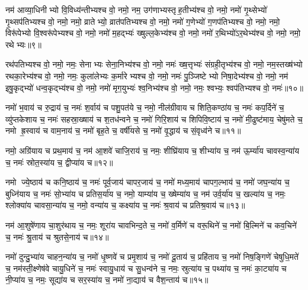 {\anuvakamend[{कु॒लु॒ञ्चाना॒म्पत॑ये॒ नमो॒ नमोऽश्व॑पतिभ्य॒स्त्रीणि॑ च॥३॥}]}

नम॑ आव्या॒धिनीभ्यो वि॒विध्य॑न्तीभ्यश्च वो॒ नमो॒ नम॒ उग॑णाभ्यस्तृह॒तीभ्य॑श्च वो॒ नमो॒ नमो॑ गृ॒थ्सेभ्यो॑ गृ॒थ्सप॑तिभ्यश्च वो॒ नमो॒ नमो॒ व्रातेभ्यो॒ व्रात॑पतिभ्यश्च वो॒ नमो॒ नमो॑ ग॒णेभ्यो॑ ग॒णप॑तिभ्यश्च वो॒ नमो॒ नमो॒ विरू॑पेभ्यो वि॒श्वरू॑पेभ्यश्च वो॒ नमो॒ नमो॑ म॒हद्भ्यः॑ ख्षुल्ल॒केभ्य॑श्च वो॒ नमो॒ नमो॑ र॒थिभ्यो॑ऽर॒थेभ्य॑श्च वो॒ नमो॒ नमो॒ रथेभ्यः॥९॥

रथ॑पतिभ्यश्च वो॒ नमो॒ नमः॒ सेनाभ्यः सेना॒निभ्य॑श्च वो॒ नमो॒ नमः॑ ख्ष॒त्तृभ्यः॑ संग्रही॒तृभ्य॑श्च वो॒ नमो॒ नम॒स्तख्ष॑भ्यो रथका॒रेभ्य॑श्च वो॒ नमो॒ नमः॒ कुला॑लेभ्यः क॒र्मारेभ्यश्च वो॒ नमो॒ नमः॑ पु॒ञ्जिष्टेभ्यो निषा॒देभ्य॑श्च वो॒ नमो॒ नम॑ इषु॒कृद्भ्यो॑ धन्व॒कृद्भ्य॑श्च वो॒ नमो॒ नमो॑ मृग॒युभ्यः॑ श्व॒निभ्य॑श्च वो॒ नमो॒ नमः॒ श्वभ्यः॒ श्वप॑तिभ्यश्च वो॒ नमः॑॥१०॥

{\anuvakamend[{रथेभ्यः॒ श्वप॑तिभ्यश्च॒ द्वे च॑॥४॥}]}

नमो॑ भ॒वाय॑ च रु॒द्राय॑ च॒ नमः॑ श॒र्वाय॑ च पशु॒पत॑ये च॒ नमो॒ नील॑ग्रीवाय च शिति॒कण्ठा॑य च॒ नमः॑ कप॒र्दिने॑ च॒ व्यु॑प्तकेशाय च॒ नमः॑ सहस्रा॒ख्षाय॑ च श॒तध॑न्वने च॒ नमो॑ गिरि॒शाय॑ च शिपिवि॒ष्टाय॑ च॒ नमो॑ मी॒ढुष्ट॑माय॒ चेषु॑मते च॒ नमो ह्र॒स्वाय॑ च वाम॒नाय॑ च॒ नमो॑ बृह॒ते च॒ वर्\mbox{}षी॑यसे च॒ नमो॑ वृ॒द्धाय॑ च सं॒वृध्व॑ने च॥११॥

नमो॒ अग्रि॑याय च प्रथ॒माय॑ च॒ नम॑ आ॒शवे॑ चाजि॒राय॑ च॒ नमः॒ शीघ्रि॑याय च॒ शीभ्या॑य च॒ नम॑ ऊ॒र्म्या॑य चावस्व॒न्या॑य च॒ नमः॑ स्रोत॒स्या॑य च॒ द्वीप्या॑य च॥१२॥

{\anuvakamend[{सं॒ वृध्व॑ने च॒ पञ्च॑विशतिश्च॥५॥}]}

नमो ज्ये॒ष्ठाय॑ च कनि॒ष्ठाय॑ च॒ नमः॑ पूर्व॒जाय॑ चापर॒जाय॑ च॒ नमो॑ मध्य॒माय॑ चापग॒ल्भाय॑ च॒ नमो॑ जघ॒न्या॑य च॒ बुध्नि॑याय च॒ नमः॑ सो॒भ्या॑य च प्रतिस॒र्या॑य च॒ नमो॒ याम्या॑य च॒ ख्षेम्या॑य च॒ नम॑ उर्व॒र्या॑य च॒ खल्या॑य च॒ नमः॒ श्लोक्या॑य चावसा॒न्या॑य च॒ नमो॒ वन्या॑य च॒ कक्ष्या॑य च॒ नमः॑ श्र॒वाय॑ च प्रतिश्र॒वाय॑ च॥१३॥

नम॑ आ॒शुषे॑णाय चा॒शुर॑थाय च॒ नमः॒ शूरा॑य चावभिन्द॒ते च॒ नमो॑ व॒र्मिणे॑ च वरू॒थिने॑ च॒ नमो॑ बि॒ल्मिने॑ च कव॒चिने॑ च॒ नमः॑ श्रु॒ताय॑ च श्रुतसे॒नाय॑ च॥१४॥

{\anuvakamend[{प्र॒ति॒श्र॒वाय॑ च॒ पञ्च॑विशतिश्च॥६॥}]}

नमो॑ दुन्दु॒भ्या॑य चाहन॒न्या॑य च॒ नमो॑ धृ॒ष्णवे॑ च प्रमृ॒शाय॑ च॒ नमो॑ दू॒ताय॑ च॒ प्रहि॑ताय च॒ नमो॑ निष॒ङ्गिणे॑ चेषुधि॒मते॑ च॒ नम॑स्ती॒क्ष्णेष॑वे चायु॒धिने॑ च॒ नमः॑ स्वायु॒धाय॑ च सु॒धन्व॑ने च॒ नमः॒ स्रुत्या॑य च॒ पथ्या॑य च॒ नमः॑ का॒ट्या॑य च नी॒प्या॑य च॒ नमः॒ सूद्या॑य च सर॒स्या॑य च॒ नमो॑ ना॒द्याय॑ च वैश॒न्ताय॑ च॥१५॥

